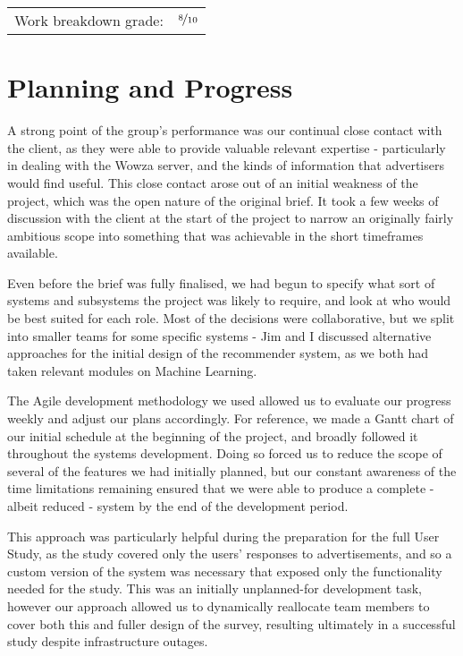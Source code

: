 \hfill \begin{tabular}{l l}
	Work breakdown grade: & $\nicefrac{8}{10}$ \\
\end{tabular}

\section*{Planning and Progress}

A strong point of the group's performance was our continual close contact with the client, as they were able to provide valuable relevant expertise - particularly in dealing with the Wowza server, and the kinds of information that advertisers would find useful. This close contact arose out of an initial weakness of the project, which was the open nature of the original brief. It took a few weeks of discussion with the client at the start of the project to narrow an originally fairly ambitious scope into something that was achievable in the short timeframes available.

Even before the brief was fully finalised, we had begun to specify what sort of systems and subsystems the project was likely to require, and look at who would be best suited for each role. Most of the decisions were collaborative, but we split into smaller teams for some specific systems - Jim and I discussed alternative approaches for the initial design of the recommender system, as we both had taken relevant modules on Machine Learning.

The Agile development methodology we used allowed us to evaluate our progress weekly and adjust our plans accordingly. For reference, we made a Gantt chart of our initial schedule at the beginning of the project, and broadly followed it throughout the systems development. Doing so forced us to reduce the scope of several of the features we had initially planned, but our constant awareness of the time limitations remaining ensured that we were able to produce a complete - albeit reduced - system by the end of the development period.

This approach was particularly helpful during the preparation for the full User Study, as the study covered only the users' responses to advertisements, and so a custom version of the system was necessary that exposed only the functionality needed for the study. This was an initially unplanned-for development task, however our approach allowed us to dynamically reallocate team members to cover both this and fuller design of the survey, resulting ultimately in a successful study despite infrastructure outages.


